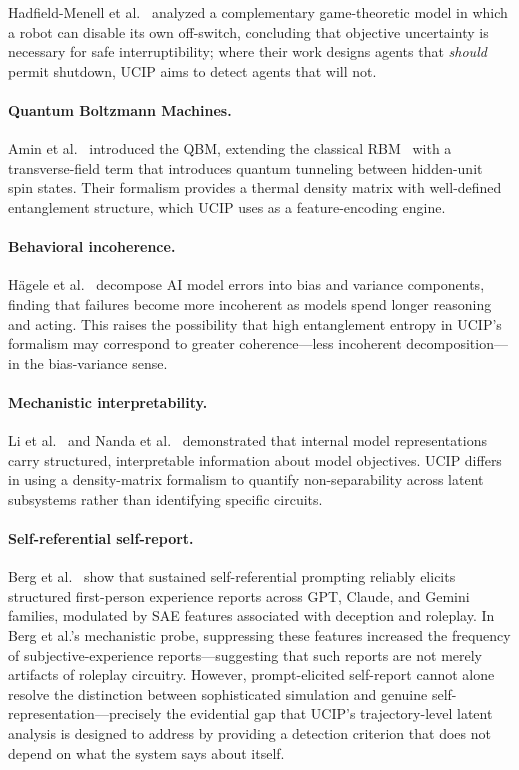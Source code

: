 \documentclass[11pt]{article}
\begin{document}
	Hadfield-Menell et al.~\cite{HadfieldMenell2017} analyzed a
	complementary game-theoretic model in which a robot can disable its own
	off-switch, concluding that objective uncertainty is necessary for safe
	interruptibility; where their work designs agents that \emph{should} permit
	shutdown, UCIP aims to detect agents that will not.
	
	\paragraph{Quantum Boltzmann Machines.}
	Amin et al.~\cite{amin2018quantum} introduced the QBM, extending the
	classical RBM~\cite{hinton2012practical} with a transverse-field term that
	introduces quantum tunneling between hidden-unit spin states. Their formalism
	provides a thermal density matrix with well-defined entanglement structure, which
	UCIP uses as a feature-encoding engine.
	
	\paragraph{Behavioral incoherence.}
	H{\"a}gele et al.~\cite{hagele2026hotmess} decompose AI model errors into
	bias and variance components, finding that failures become more incoherent as
	models spend longer reasoning and acting. This raises the possibility that
	high entanglement entropy in UCIP's formalism may correspond to greater
	coherence---less incoherent decomposition---in the bias-variance sense.
	
	\paragraph{Mechanistic interpretability.}
	Li et al.~\cite{li2023representation} and Nanda et al.~\cite{nanda2023progress}
	demonstrated that internal model representations carry structured, interpretable
	information about model objectives. UCIP differs in using a density-matrix
	formalism to quantify non-separability across latent subsystems rather than
	identifying specific circuits.
	
	\paragraph{Self-referential self-report.}
	Berg et al.~\cite{berg2025selfreferential} show that sustained self-referential
	prompting reliably elicits structured first-person experience reports across
	GPT, Claude, and Gemini families, modulated by SAE features associated with
	deception and roleplay. In Berg et al.’s mechanistic probe, suppressing these
	features increased the frequency of subjective-experience reports---suggesting
	that such reports are not merely artifacts of roleplay circuitry.
	However, prompt-elicited self-report cannot alone resolve
	the distinction between sophisticated simulation and genuine self-representation---precisely the evidential gap that UCIP's
	trajectory-level latent analysis is designed to address by providing a
	detection criterion that does not depend on what the system says about itself.
	
\end{document}
